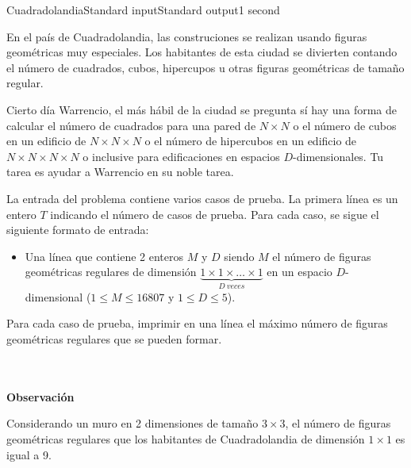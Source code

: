\begin{problem}{Cuadradolandia}{Standard input}{Standard output}{1 second}{}

En el país de Cuadradolandia, las construciones se realizan usando figuras geométricas muy especiales. Los habitantes de esta ciudad se divierten contando el número de cuadrados, cubos, hipercupos u otras figuras geométricas de tamaño regular.

Cierto día Warrencio, el más hábil de la ciudad se pregunta sí hay una forma de calcular el número de cuadrados para una pared de $N\times N$ o el número de cubos en un edificio de $N\times N\times N$ o el número de hipercubos en un edificio de $N\times N\times N\times N$ o inclusive para edificaciones en espacios $D$-dimensionales. Tu tarea es ayudar a Warrencio en su noble tarea.

\InputFile

La entrada del problema contiene varios casos de prueba. La primera línea es un entero $T$ indicando el número de casos de prueba. Para cada caso, se sigue el siguiente formato de entrada:

\begin{itemize}
\item Una línea que contiene 2 enteros $M$ y $D$ siendo $M$ el número de figuras geométricas regulares de dimensión $\underbrace{1\times 1\times \dots \times 1}_{D~veces}$ en un espacio $D$-dimensional ($1 \leq M \leq 16807$ y $1 \leq D \leq 5$).
\end{itemize}

\OutputFile
Para cada caso de prueba, imprimir en una línea el máximo número de figuras geométricas regulares que se pueden formar. 


\Example

\begin{example}
\end{example}

~\\ \\
\textbf{\Large{\textsf{Observación}}}

Considerando un muro en 2 dimensiones de tamaño $3\times 3$, el número de figuras geométricas regulares que los habitantes de Cuadradolandia de dimensión $1\times 1$ es igual a 9.
\end{problem}
